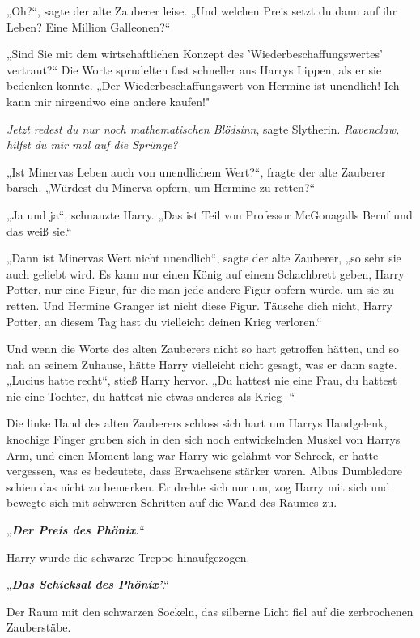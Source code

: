 {„Oh?“, sagte der alte Zauberer leise. „Und welchen Preis setzt du dann auf ihr Leben? Eine Million Galleonen?“

„Sind Sie mit dem wirtschaftlichen Konzept des 'Wiederbeschaffungswertes' vertraut?“ Die Worte sprudelten fast schneller aus Harrys Lippen, als er sie bedenken konnte. „Der Wiederbeschaffungswert von Hermine ist unendlich! Ich kann mir nirgendwo eine andere kaufen!"

\emph{Jetzt redest du nur noch mathematischen Blödsinn}, sagte Slytherin. \emph{Ravenclaw, hilfst du mir mal auf die Sprünge?}

„Ist Minervas Leben auch von unendlichem Wert?“, fragte der alte Zauberer barsch. „Würdest du Minerva opfern, um Hermine zu retten?“

„Ja und ja“, schnauzte Harry. „Das ist Teil von Professor McGonagalls Beruf und das weiß sie.“

„Dann ist Minervas Wert nicht unendlich“, sagte der alte Zauberer, „so sehr sie auch geliebt wird. Es kann nur einen König auf einem Schachbrett geben, Harry Potter, nur eine Figur, für die man jede andere Figur opfern würde, um sie zu retten. Und Hermine Granger ist nicht diese Figur. Täusche dich nicht, Harry Potter, an diesem Tag hast du vielleicht deinen Krieg verloren.“

Und wenn die Worte des alten Zauberers nicht so hart getroffen hätten, und so nah an seinem Zuhause, hätte Harry vielleicht nicht gesagt, was er dann sagte.\\ „Lucius hatte recht“, stieß Harry hervor. „Du hattest nie eine Frau, du hattest nie eine Tochter, du hattest nie etwas anderes als Krieg -“

Die linke Hand des alten Zauberers schloss sich hart um Harrys Handgelenk, knochige Finger gruben sich in den sich noch entwickelnden Muskel von Harrys Arm, und einen Moment lang war Harry wie gelähmt vor Schreck, er hatte vergessen, was es bedeutete, dass Erwachsene stärker waren. Albus Dumbledore schien das nicht zu bemerken. Er drehte sich nur um, zog Harry mit sich und bewegte sich mit schweren Schritten auf die Wand des Raumes zu.

„\textbf{\emph{Der Preis des Phönix.}}“

Harry wurde die schwarze Treppe hinaufgezogen.

„\textbf{\emph{Das Schicksal des Phönix'}}.“

Der Raum mit den schwarzen Sockeln, das silberne Licht fiel auf die zerbrochenen Zauberstäbe.

}
